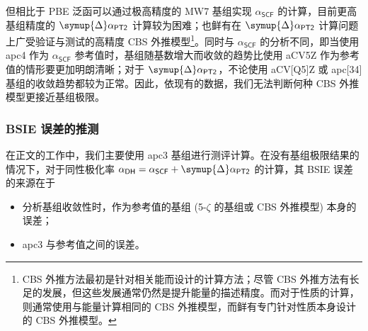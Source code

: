 但相比于 PBE 泛函可以通过极高精度的 MW7 基组实现 $\alpha_\textsf{SCF}$ 的计算，目前更高基组精度的 $\symup{\Delta} \alpha_\textsf{PT2}$ 计算较为困难；也鲜有在 $\symup{\Delta} \alpha_\textsf{PT2}$ 计算问题上广受验证与测试的高精度 CBS 外推模型\footnote{CBS 外推方法最初是针对相关能而设计的计算方法\cite{Nyden-Petersson.JCP.1981}；尽管 CBS 外推方法有长足的发展\cite{Peterson-Dunning.JCP.1994, Nyden-Petersson.JCP.1981, Petersson-Mantzaris.JCP.1988, Jensen-Jensen.TCA.2005, Karton-Martin.TCA.2006, Klopper-Kutzelnigg.JMST.1986, Kutzelnigg-Morgan.JCP.1992, Martin-Martin.CPL.1996, Helgaker-Noga.JCP.1997, Halkier-Wilson.CPL.1998, Halkier-Olsen.CPL.1999}，但这些发展通常仍然是提升能量的描述精度。而对于性质的计算，则通常使用与能量计算相同的 CBS 外推模型\cite{Monten-Deleuze.MP.2011, Huzak-Deleuze.JCP.2013, Hait-Head-Gordon.JCTC.2018, Hait-Head-Gordon.PCCP.2018}，而鲜有专门针对性质本身设计的 CBS 外推模型。}。同时与 $\alpha_\textsf{SCF}$ 的分析不同，即当使用 apc4 作为 $\alpha_\textsf{SCF}$ 参考值时，基组随基数增大而收敛的趋势比使用 aCV5Z 作为参考值的情形要更加明朗清晰；对于 $\symup{\Delta} \alpha_\textsf{PT2}$，不论使用 aCV[Q5]Z 或 apc[34] 基组的收敛趋势都较为正常。因此，依现有的数据，我们无法判断何种 CBS 外推模型更接近基组极限。

\subsubsection{BSIE 误差的推测}

在正文的工作中，我们主要使用 apc3 基组进行测评计算。在没有基组极限结果的情况下，对于同性极化率 $\alpha_\textsf{DH} = \alpha_\textsf{SCF} + \symup{\Delta} \alpha_\textsf{PT2}$ 的计算，其 BSIE 误差的来源在于
\begin{itemize}[nosep]
    \item 分析基组收敛性时，作为参考值的基组 (5-$\zeta$ 的基组或 CBS 外推模型) 本身的误差；
    \item apc3 与参考值之间的误差。
\end{itemize}

